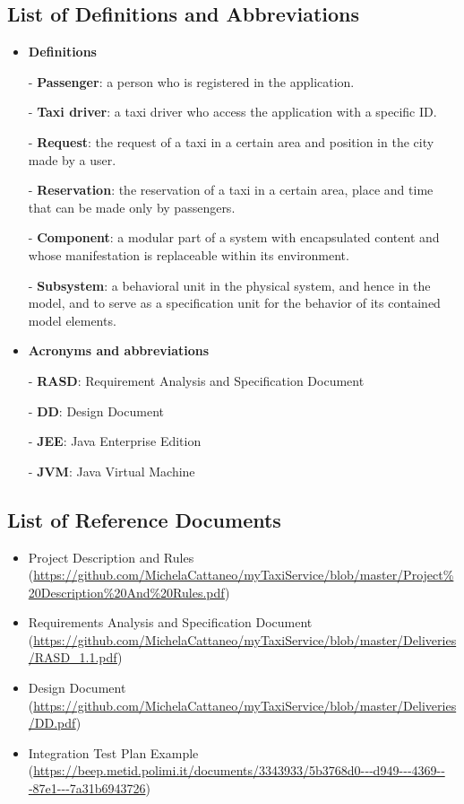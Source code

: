 \documentclass[18pt,oneside,a4paper, titlepage]{article}
\begin{document}
	\subsection{List of	Definitions	and	Abbreviations}
		\begin{itemize}
			\item \textbf{Definitions}
			\item[-] \textbf{Passenger}: a person who is registered in the application.
			\item[-] \textbf{Taxi driver}: a taxi driver who access the application with a specific ID.
			\item[-] \textbf{Request}: the request of a taxi in a certain area and position in the city made by a user.
			\item[-] \textbf{Reservation}: the reservation of a taxi in a certain area, place and time that can be made only by passengers.
			\item[-] \textbf{Component}: a modular part of a system with encapsulated content and whose manifestation is replaceable within its environment.
			\item[-] \textbf{Subsystem}: a behavioral unit in the physical system, and hence in the model, and to serve as a specification unit for the behavior of its contained model elements.
						
			\item \textbf{Acronyms and abbreviations}
			\item[-] \textbf{RASD}: Requirement Analysis and Specification Document
			\item[-] \textbf{DD}: Design Document
			\item[-] \textbf{JEE}: Java Enterprise Edition
			\item[-] \textbf{JVM}: Java Virtual Machine
			
		\end{itemize}
	\subsection{List of	Reference Documents}
		\begin{itemize}
			\item Project Description and Rules (\url{https://github.com/MichelaCattaneo/myTaxiService/blob/master/Project\%20Description\%20And\%20Rules.pdf})
			\item Requirements Analysis and Specification Document (\url{https://github.com/MichelaCattaneo/myTaxiService/blob/master/Deliveries/RASD_1.1.pdf})
			\item Design Document (\url{https://github.com/MichelaCattaneo/myTaxiService/blob/master/Deliveries/DD.pdf})
			\item Integration Test Plan Example (\url{https://beep.metid.polimi.it/documents/3343933/5b3768d0-­‐‑d949-­‐‑4369-­‐‑87e1-­‐‑7a31b6943726})
		\end{itemize}
\end{document}
